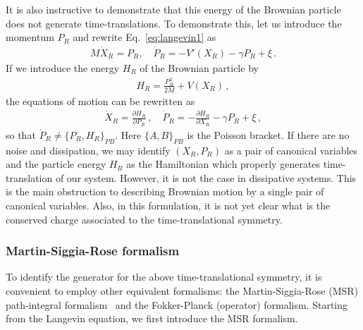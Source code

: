 \documentclass[a4paper,11pt]{article}
\begin{document}
It is also instructive to demonstrate that this energy of the 
Brownian particle does not generate time-translations. 
To demonstrate this, 
let us introduce the momentum $P_R$ and rewrite Eq.~\eqref{eq:langevin1} as
\begin{align}
 \label{eq:eom_xp}
 M \dot{X}_R  = P_R ,  \quad
 \dot{P}_R = -V' (X_R) - \gamma P_R + \xi \,.
\end{align}
If we introduce the energy $H_R$ of the Brownian particle by
\begin{align}
 H_R = \frac{P^2_R}{2M} + V(X_R) \,,
\end{align}
the equations of motion can be rewritten as
\begin{align}
 \dot{X}_R=\frac{\partial H_R}{\partial P_R} 
 \,,
 \quad
 \dot{P}_R=-\frac{\partial H_R}{\partial X_R}- \gamma P_R + \xi\, ,
 \label{eq:langevin2}
\end{align}
so that $\dot{P}_R \neq \{P_R, H_R \}_{PB}$. 
Here $\{A,B\}_{PB}$ is the Poisson bracket.
If there are no noise and dissipation, 
we may identify $(X_R,P_R)$ as a pair of canonical variables and 
the particle energy $H_R$ as the Hamiltonian which properly 
generates time-translation of our system. 
However, it is not the case in dissipative systems. 
This is the main obstruction to describing Brownian motion 
by a single pair of canonical variables. 
Also, in this formulation, it is not yet clear what is 
the conserved charge associated to the time-translational symmetry.

\subsubsection{Martin-Siggia-Rose formalism}
\label{section:lmsrfp}
To identify the generator for the above time-translational symmetry, 
it is convenient to employ other equivalent formalisms: 
the Martin-Siggia-Rose (MSR) path-integral formalism~\cite{PhysRevA.8.423,Janssen1976,PhysRevB.18.4913} and the Fokker-Planck (operator) formalism. 
Starting from the Langevin equation, 
we first introduce the MSR formalism.
\end{document}
